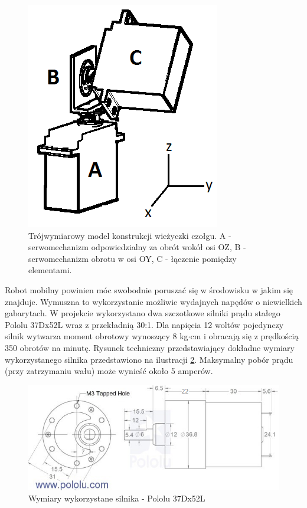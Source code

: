  \begin{figure}[H]
    \begin{center}
      \includegraphics[scale=0.45]{imgs/wieza_3d.png}
 	\caption[Model wieżyczki.]{\small{Trójwymiarowy model konstrukcji wieżyczki czołgu. A - serwomechanizm odpowiedzialny za obrót wokół osi OZ, B - serwomechanizm obrotu w osi OY, C - łączenie pomiędzy elementami.}}
	\label{wieza3d}
    \end{center}
  \end{figure}
Robot mobilny powinien móc swobodnie poruszać się w środowisku w jakim się znajduje. Wymuszna to wykorzystanie możliwie wydajnych napędów o niewielkich gabarytach. W projekcie wykorzystano dwa szczotkowe silniki prądu stałego Pololu 37Dx52L wraz z przekładnią 30:1. Dla napięcia 12 woltów pojedynczy silnik wytwarza moment obrotowy wynoszący 8 kg$\cdot$cm i obracają się z prędkością 350 obrotów na minutę. Rysunek techniczny przedstawiający dokładne wymiary wykorzystanego silnika przedstawiono na ilustracji \ref{wymiary_silnika}. Maksymalny pobór prądu (przy zatrzymaniu wału) może wynieść około 5 amperów.

  \begin{figure}[H]
    \begin{center}
      \includegraphics[scale=0.7]{imgs/silnik_wymiary.png}
 	\caption[Wymiary silnika Pololu 37Dx52L ]{\small{Wymiary wykorzystane silnika - Pololu 37Dx52L }\footnotemark}
	\label{wymiary_silnika}
    \end{center}
  \end{figure}

